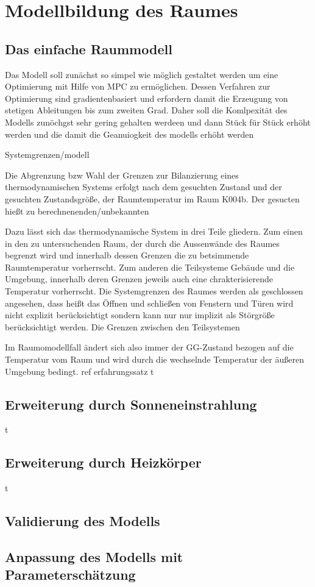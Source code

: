 %
%

\chapter{Modellbildung des Raumes}
\label{chap:modellbildung}

\renewcommand{\chapterheadstartvskip}{\vspace*{-0.5cm}}

\section{Das einfache Raummodell}

Das Modell soll zunächst so simpel wie möglich gestaltet werden um eine Optimierung mit Hilfe von MPC zu ermöglichen. Dessen Verfahren zur Optimierung sind gradientenbasiert und erfordern damit die Erzeugung von stetigen Ableitungen bis zum zweiten Grad. Daher soll die Komlpexität des Modells zunöchgst sehr gering gehalten werdeen und dann Stück für Stück erhöht werden und die damit die Geanuiogkeit des modells erhöht werden

Systemgrenzen/modell


Die Abgrenzung bzw Wahl der Grenzen zur Bilanzierung eines thermodynamischen Systems erfolgt nach dem gesuchten Zustand und der gesuchten Zustandsgröße, der Raumtemperatur im Raum K004b. Der gesucten hießt zu berechnenenden/unbekannten

Dazu lässt sich das thermodynamische System in drei Teile gliedern. Zum einen in den zu untersuchenden Raum, der durch die Aussenwände des Raumes begrenzt wird und innerhalb dessen Grenzen die zu betsimmende Raumtemperatur vorherrscht. Zum anderen die Teilsysteme Gebäude und die Umgebung, innerhalb deren Grenzen jeweils auch eine chrakterisierende Temperatur vorherrscht. Die Systemgrenzen des Raumes werden als geschlossen angesehen, dass heißt das Öffnen und schließen von Fenstern und Türen wird nicht explizit berücksichtigt sondern kann nur nur implizit als Störgröße berücksichtigt werden. Die Grenzen zwischen den Teilsystemen 

Im Raumomodellfall ändert sich also immer der GG-Zustand bezogen auf die Temperatur vom Raum und wird durch die wechselnde Temperatur der äußeren Umgebung bedingt.
ref erfahrungssatz
t 
\newpage

\section{Erweiterung durch Sonneneinstrahlung}

\newpage
t 
\newpage

\section{Erweiterung durch Heizkörper}
t 
\newpage
\section{Validierung des Modells}

\section{Anpassung des Modells mit Parameterschätzung}
